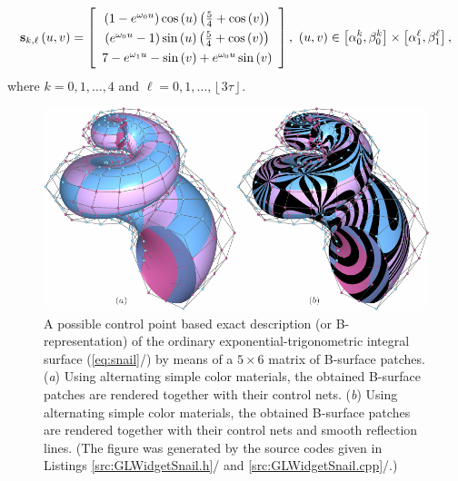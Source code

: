 \documentclass[b5paper, twosided]{book}
\DeclareRobustCommand{\mref}[1]{\ref{#1}{\relsize{-1}/\pageref{#1}}}
\begin{document}
\begin{align}
\mathbf{s}_{k,\ell}\left(u,v\right) =
\def\arraystretch{1.3}
\left[\begin{array}{c}\left(1-e^{\omega_0 u}\right) \cos\left(u\right) \left(\frac{5}{4}+\cos\left(v\right)\right)\\\left(e^{\omega_0 u}-1\right) \sin\left(u\right) \left(\frac{5}{4}+\cos\left(v\right)\right)\\7-e^{\omega_1 u} - \sin\left(v\right) + e^{\omega_0 u} \sin\left(v\right)\end{array}\right],\def\arraystretch{1.0} 
~
\left(u,v\right)\in\left[\alpha_0^k, \beta_0^k\right]\times\left[\alpha_1^{\ell}, \beta_1^{\ell}\right],
\label{eq:snail}
\end{align}
where $k=0,1,\ldots,4$ and $\ell = 0,1,\ldots,\left\lfloor 3\tau\right\rfloor$.

\newpage{}



\begin{figure}[!htb]
    \centering
    \includegraphics[]{images/control_point_based_exact_description_snail_tau_2.pdf}
    \caption{A possible control point based exact description (or B-representation) of the ordinary exponential-trigonometric integral surface (\mref{eq:snail}) by means of a $5 \times 6$ matrix of B-surface patches. (\textit{a}) Using alternating simple color materials, the obtained B-surface patches are rendered together with their control nets. (\textit{b}) Using alternating simple color materials, the obtained B-surface patches are rendered together with their control nets and smooth reflection lines. (The figure was generated by the source codes given in Listings \mref{src:GLWidgetSnail.h} and \mref{src:GLWidgetSnail.cpp}.)}
    \label{fig:control_point_based_exact_description_snail_tau_2}
\end{figure}
\end{document}
